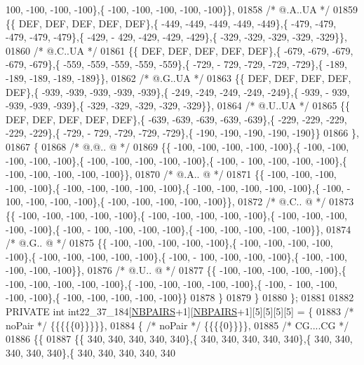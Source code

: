 \begin{DoxyCode}
      100, -100, -100, -100\},\{ -100, -100, -100, -100, -100\}\},
01858 \textcolor{comment}{/*  @.A..UA */}
01859 \{\{  DEF,  DEF,  DEF,  DEF,  DEF\},\{ -449, -449, -449, -449, -449\},\{ -479, -479, -479, -479, -479\},\{ -429, -
      429, -429, -429, -429\},\{ -329, -329, -329, -329, -329\}\},
01860 \textcolor{comment}{/*  @.C..UA */}
01861 \{\{  DEF,  DEF,  DEF,  DEF,  DEF\},\{ -679, -679, -679, -679, -679\},\{ -559, -559, -559, -559, -559\},\{ -729, -
      729, -729, -729, -729\},\{ -189, -189, -189, -189, -189\}\},
01862 \textcolor{comment}{/*  @.G..UA */}
01863 \{\{  DEF,  DEF,  DEF,  DEF,  DEF\},\{ -939, -939, -939, -939, -939\},\{ -249, -249, -249, -249, -249\},\{ -939, -
      939, -939, -939, -939\},\{ -329, -329, -329, -329, -329\}\},
01864 \textcolor{comment}{/*  @.U..UA */}
01865 \{\{  DEF,  DEF,  DEF,  DEF,  DEF\},\{ -639, -639, -639, -639, -639\},\{ -229, -229, -229, -229, -229\},\{ -729, -
      729, -729, -729, -729\},\{ -190, -190, -190, -190, -190\}\}
01866 \},
01867 \{
01868 \textcolor{comment}{/*  @.@.. @ */}
01869 \{\{ -100, -100, -100, -100, -100\},\{ -100, -100, -100, -100, -100\},\{ -100, -100, -100, -100, -100\},\{ -100, -
      100, -100, -100, -100\},\{ -100, -100, -100, -100, -100\}\},
01870 \textcolor{comment}{/*  @.A.. @ */}
01871 \{\{ -100, -100, -100, -100, -100\},\{ -100, -100, -100, -100, -100\},\{ -100, -100, -100, -100, -100\},\{ -100, -
      100, -100, -100, -100\},\{ -100, -100, -100, -100, -100\}\},
01872 \textcolor{comment}{/*  @.C.. @ */}
01873 \{\{ -100, -100, -100, -100, -100\},\{ -100, -100, -100, -100, -100\},\{ -100, -100, -100, -100, -100\},\{ -100, -
      100, -100, -100, -100\},\{ -100, -100, -100, -100, -100\}\},
01874 \textcolor{comment}{/*  @.G.. @ */}
01875 \{\{ -100, -100, -100, -100, -100\},\{ -100, -100, -100, -100, -100\},\{ -100, -100, -100, -100, -100\},\{ -100, -
      100, -100, -100, -100\},\{ -100, -100, -100, -100, -100\}\},
01876 \textcolor{comment}{/*  @.U.. @ */}
01877 \{\{ -100, -100, -100, -100, -100\},\{ -100, -100, -100, -100, -100\},\{ -100, -100, -100, -100, -100\},\{ -100, -
      100, -100, -100, -100\},\{ -100, -100, -100, -100, -100\}\}
01878 \}
01879 \}
01880 \};
01881 
01882 PRIVATE \textcolor{keywordtype}{int} int22\_37\_184[\hyperlink{energy__const_8h_a5e75221c779d618eab81e096f37e32ce}{NBPAIRS}+1][\hyperlink{energy__const_8h_a5e75221c779d618eab81e096f37e32ce}{NBPAIRS}+1][5][5][5][5] = \{
01883 \textcolor{comment}{/* noPair */} \{\{\{\{\{0\}\}\}\}\},
01884 \{ \textcolor{comment}{/* noPair */} \{\{\{\{0\}\}\}\},
01885 \textcolor{comment}{/* CG....CG */}
01886 \{\{
01887 \{\{ 340, 340, 340, 340, 340\},\{ 340, 340, 340, 340, 340\},\{ 340, 340, 340, 340, 340\},\{ 340, 340, 340, 340, 340

\end{DoxyCode}
